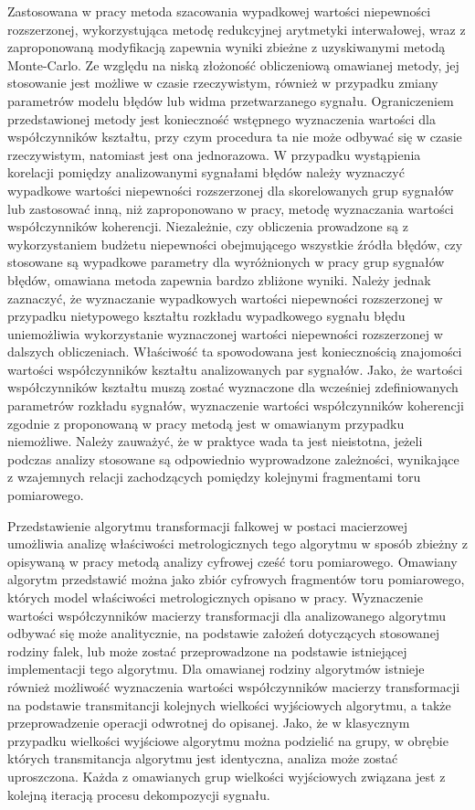 Zastosowana w pracy metoda szacowania wypadkowej wartości niepewności rozszerzonej, wykorzystująca metodę redukcyjnej arytmetyki interwałowej, wraz z zaproponowaną modyfikacją zapewnia wyniki zbieżne z uzyskiwanymi metodą Monte-Carlo. Ze względu na niską złożoność obliczeniową omawianej metody, jej stosowanie jest możliwe w czasie rzeczywistym, również w przypadku zmiany parametrów modelu błędów lub widma przetwarzanego sygnału. Ograniczeniem przedstawionej metody jest konieczność wstępnego wyznaczenia wartości dla współczynników kształtu, przy czym procedura ta nie może odbywać się w czasie rzeczywistym, natomiast jest ona jednorazowa. W przypadku wystąpienia korelacji pomiędzy analizowanymi sygnałami błędów należy wyznaczyć wypadkowe wartości niepewności rozszerzonej dla skorelowanych grup sygnałów lub zastosować inną, niż zaproponowano w pracy, metodę wyznaczania wartości współczynników koherencji. Niezależnie, czy obliczenia prowadzone są z wykorzystaniem budżetu niepewności obejmującego wszystkie źródła błędów, czy stosowane są wypadkowe parametry dla wyróżnionych w pracy grup sygnałów błędów, omawiana metoda zapewnia bardzo zbliżone wyniki. Należy jednak zaznaczyć, że wyznaczanie wypadkowych wartości niepewności rozszerzonej w przypadku nietypowego kształtu rozkładu wypadkowego sygnału błędu uniemożliwia wykorzystanie wyznaczonej wartości niepewności rozszerzonej w dalszych obliczeniach. Właściwość ta spowodowana jest koniecznością znajomości wartości współczynników kształtu analizowanych par sygnałów. Jako, że wartości współczynników kształtu muszą zostać wyznaczone dla wcześniej zdefiniowanych parametrów rozkładu sygnałów, wyznaczenie wartości współczynników koherencji zgodnie z proponowaną w pracy metodą jest w omawianym przypadku niemożliwe. Należy zauważyć, że w praktyce wada ta jest nieistotna, jeżeli podczas analizy stosowane są odpowiednio wyprowadzone zależności, wynikające z wzajemnych relacji zachodzących pomiędzy kolejnymi fragmentami toru pomiarowego.

Przedstawienie algorytmu transformacji falkowej w postaci macierzowej umożliwia analizę właściwości metrologicznych tego algorytmu w sposób zbieżny z opisywaną w pracy metodą analizy cyfrowej cześć toru pomiarowego. Omawiany algorytm przedstawić można jako zbiór cyfrowych fragmentów toru pomiarowego, których model właściwości metrologicznych opisano w pracy. Wyznaczenie wartości współczynników macierzy transformacji dla analizowanego algorytmu odbywać się może analitycznie, na podstawie założeń dotyczących stosowanej rodziny falek, lub może zostać przeprowadzone na podstawie istniejącej implementacji tego algorytmu. Dla omawianej rodziny algorytmów istnieje również możliwość wyznaczenia wartości współczynników macierzy transformacji na podstawie transmitancji kolejnych wielkości wyjściowych algorytmu, a także przeprowadzenie operacji odwrotnej do opisanej. Jako, że w klasycznym przypadku wielkości wyjściowe algorytmu można podzielić na grupy, w obrębie których transmitancja algorytmu jest identyczna, analiza może zostać uproszczona. Każda z omawianych grup wielkości wyjściowych związana jest z kolejną iteracją procesu dekompozycji sygnału.

